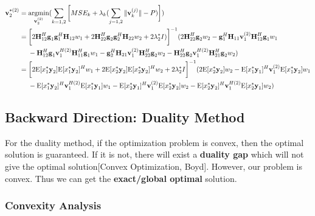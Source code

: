 \documentclass[11pt, oneside]{article}   	%
\begin{document}
\begin{align*}
\textbf{v}^{*(2)}_{2} 	&= \operatornamewithlimits{argmin}_{\textbf{v}^{(2)}_{2}}	(\displaystyle\sum_{k=1,2} 	\bigg[	MSE_{k}	+	\lambda_{k}	(\displaystyle\sum_{j=1,2}	\|	\textbf{v}^{(j)}_{k}	\|	-P	)	\bigg])	\\
				   &= 	\bigg[ 2	\textbf{H}^{H}_{12}	\textbf{g}_{1}	\textbf{g}^{H}_{1}		\textbf{H}_{12}	w_1
				   +	2	\textbf{H}^{H}_{22}	\textbf{g}_{2}	\textbf{g}^{H}_{2}		\textbf{H}_{22}	w_2	+2	\lambda^{*}_2 I)
				   \bigg]^{-1} 
				   (2	\textbf{H}^{H}_{22}	\textbf{g}_{2}	w_2		
				   -	\textbf{g}^{H}_{1}	\textbf{H}_{11}	\textbf{v}^{(2)}_{1} 	\textbf{H}^{H}_{12}	\textbf{g}_{1} w_1	\\
				   &\ \ \ \ 
				   -	\textbf{H}^{H}_{12}	\textbf{g}_{1}	\textbf{v}^{H(2)}_{1}	\textbf{H}^{H}_{11}	\textbf{g}_{1}	w_1
				   -	\textbf{g}^{H}_{2}	\textbf{H}_{21}	\textbf{v}^{(2)}_{1} 	\textbf{H}^{H}_{22}	\textbf{g}_{2}	w_2
				   -	\textbf{H}^{H}_{22}	\textbf{g}_{2}	\textbf{v}^{H(2)}_{1}	\textbf{H}^{H}_{21}	\textbf{g}_{2}	w_2
				   )\\
				   &=\bigg[	2	\mathrm{E}[x^*_1	\textbf{y}_2]	\mathrm{E}[x^*_1	\textbf{y}_2]^H	w_1
			      			+	2	\mathrm{E}[x^*_2	\textbf{y}_2]	\mathrm{E}[x^*_2	\textbf{y}_2]^H	w_2	+2	\lambda^{*}_2 I
			      	  \bigg]^{-1} 
				  (2	\mathrm{E}[x^*_2	\textbf{y}_2]	w_2
				  -\mathrm{E}[x^*_1	\textbf{y}_1]^H	\textbf{v}^{(2)}_{1} 	\mathrm{E}[x^*_1	\textbf{y}_2]	w_1	\\
				  &\ \ \ \ 	
				  -\mathrm{E}[x^*_1	\textbf{y}_2]^H	\textbf{v}^{H(2)}_{1} 	\mathrm{E}[x^*_1	\textbf{y}_1]	w_1	
				  -\mathrm{E}[x^*_2	\textbf{y}_1]^H	\textbf{v}^{(2)}_{1} 	\mathrm{E}[x^*_2	\textbf{y}_2]	w_2
				   -\mathrm{E}[x^*_2	\textbf{y}_2]^H	\textbf{v}^{H(2)}_{1} 	\mathrm{E}[x^*_2	\textbf{y}_1]	w_2	
				   )
\end{align*}




\subsection{Backward Direction: Duality Method}
For the duality method, if the optimization problem is convex, then the optimal solution is guaranteed. If it is not, there will exist a \textbf{duality gap} which will not give the optimal solution[Convex Optimization, Boyd]. However, our problem is convex. Thus we can get the \textbf{exact/global optimal} solution.

\subsubsection{Convexity Analysis}
\end{document}
